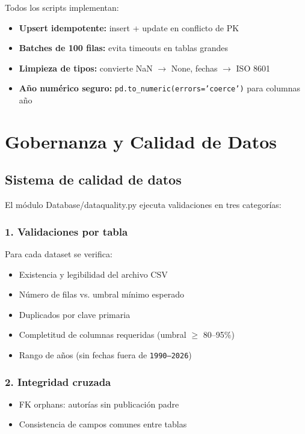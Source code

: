 \documentclass[12pt,a4paper]{report}
\newcommand{\filebreak}{\char95\allowbreak}
\newcommand{\file}[1]{{\color{cchenblue}\ttfamily\let\_\filebreak #1}}
\begin{document}
Todos los scripts implementan:
\begin{itemize}
  \item \textbf{Upsert idempotente:} insert + update en conflicto de PK
  \item \textbf{Batches de 100 filas:} evita timeouts en tablas grandes
  \item \textbf{Limpieza de tipos:} convierte NaN $\to$ None, fechas $\to$ ISO 8601
  \item \textbf{Año numérico seguro:} \texttt{pd.to\_numeric(errors='coerce')} para columnas año
\end{itemize}

\chapter{Gobernanza y Calidad de Datos}

\section{Sistema de calidad de datos}

El módulo \file{Database/data\_quality.py} ejecuta validaciones en tres categorías:

\subsection*{1. Validaciones por tabla}
Para cada dataset se verifica:
\begin{itemize}
  \item Existencia y legibilidad del archivo CSV
  \item Número de filas vs. umbral mínimo esperado
  \item Duplicados por clave primaria
  \item Completitud de columnas requeridas (umbral $\geq$ 80--95\%)
  \item Rango de años (sin fechas fuera de \texttt{1990--2026})
\end{itemize}

\subsection*{2. Integridad cruzada}
\begin{itemize}
  \item FK orphans: autorías sin publicación padre
  \item Consistencia de campos comunes entre tablas
\end{itemize}
\end{document}
